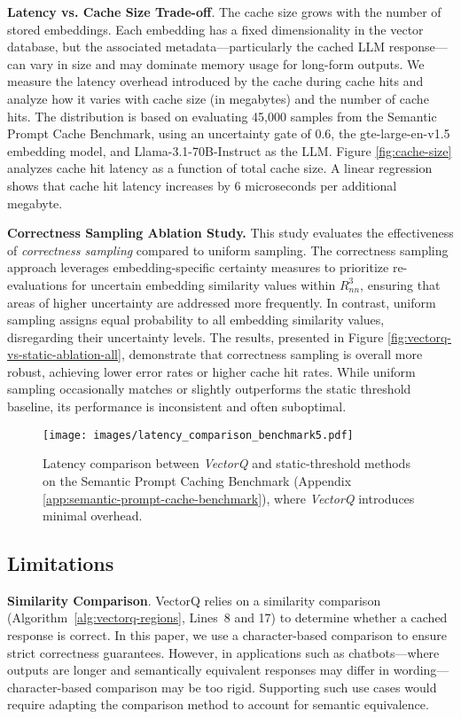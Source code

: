 \textbf{Latency vs. Cache Size Trade-off}. The cache size grows with the number of stored embeddings. Each embedding has a fixed dimensionality in the vector database, but the associated metadata—particularly the cached LLM response—can vary in size and may dominate memory usage for long-form outputs. We measure the latency overhead introduced by the cache during cache hits and analyze how it varies with cache size (in megabytes) and the number of cache hits. The distribution is based on evaluating 45,000 samples from the Semantic Prompt Cache Benchmark, using an uncertainty gate of 0.6, the gte-large-en-v1.5 embedding model, and Llama-3.1-70B-Instruct as the LLM. Figure \ref{fig:cache-size} analyzes cache hit latency as a function of total cache size. A linear regression shows that cache hit latency increases by 6 microseconds per additional megabyte.

\textbf{Correctness Sampling Ablation Study.} This study evaluates the effectiveness of \textit{correctness sampling} compared to uniform sampling. The correctness sampling approach leverages embedding-specific certainty measures to prioritize re-evaluations for uncertain embedding similarity values within $R_{nn}^3$, ensuring that areas of higher uncertainty are addressed more frequently. In contrast, uniform sampling assigns equal probability to all embedding similarity values, disregarding their uncertainty levels. The results, presented in Figure \ref{fig:vectorq-vs-static-ablation-all}, demonstrate that correctness sampling is overall more robust, achieving lower error rates or higher cache hit rates. While uniform sampling occasionally matches or slightly outperforms the static threshold baseline, its performance is inconsistent and often suboptimal.

\begin{figure}[t]
    \centering
    \texttt{[image: images/latency\_comparison\_benchmark5.pdf]}
    \caption{Latency comparison between \textit{VectorQ} and static-threshold methods on the Semantic Prompt Caching Benchmark (Appendix \ref{app:semantic-prompt-cache-benchmark}), where \textit{VectorQ} introduces minimal overhead.}
    \label{fig:latency-comparison}
\end{figure}


\subsection{Limitations}
\label{limitations}
\textbf{Similarity Comparison}. VectorQ relies on a similarity comparison (Algorithm~\ref{alg:vectorq-regions}, Lines~8 and 17) to determine whether a cached response is correct. In this paper, we use a character-based comparison to ensure strict correctness guarantees. However, in applications such as chatbots—where outputs are longer and semantically equivalent responses may differ in wording—character-based comparison may be too rigid. Supporting such use cases would require adapting the comparison method to account for semantic equivalence.

